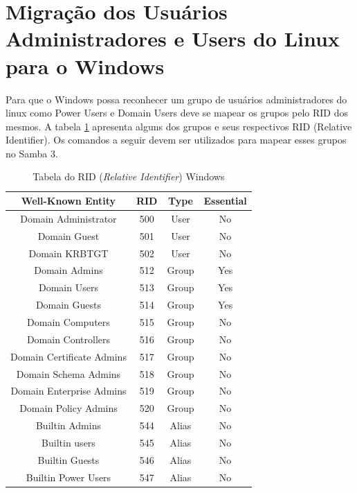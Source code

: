 \section{Migração dos Usuários Administradores e Users do Linux para o Windows}

Para que o Windows possa reconhecer um grupo de usuários administradores do linux como Power Users e Domain Users deve se mapear os grupos pelo RID dos mesmos. A tabela \ref{tab} apresenta alguns dos grupos e seus respectivos RID (Relative Identifier). Os comandos a seguir devem ser utilizados para mapear esses grupos no Samba 3.

\begin{table}[h!]
	\centering
	\caption{Tabela do RID (\textit{Relative Identifier}) Windows \cite{RID}}
	\begin{tabular}{cccc}
		
		\hline
		
		Well-Known Entity & RID & Type &	Essential \\
		
		\hline
		
		\hline
		
		Domain Administrator & 500 & User & No \\
		Domain Guest & 501 & User & No \\		
		Domain KRBTGT & 502	& User & No \\
		Domain Admins & 512 & Group & Yes \\
		Domain Users & 513 & Group & Yes \\
		Domain Guests & 514 & Group & Yes \\
		Domain Computers & 515 & Group & No \\
		Domain Controllers & 516 & Group & No \\
		Domain Certificate Admins & 517 & Group & No \\
		Domain Schema Admins & 518 & Group & No \\		
		Domain Enterprise Admins & 519 & Group & No \\
		Domain Policy Admins & 520 & Group & No \\
		Builtin Admins & 544 & Alias & No \\
		Builtin users & 545 & Alias & No \\
		Builtin Guests & 546 & Alias & No \\
		Builtin Power Users & 547 & Alias & No \\
		 	
		\hline
	\end{tabular}
	\label{tab}
\end{table}

